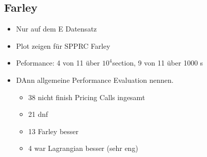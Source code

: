 \documentclass{article}
\begin{document}
\subsection*{Farley}
\begin{itemize}
    \item Nur auf dem E Datensatz
    \item Plot zeigen für SPPRC Farley
    \item Peformance: 4 von 11 über $10^4$section, 9 von 11 über 1000 s
    \item DAnn allgemeine Performance Evaluation nennen.
    \begin{itemize}
        \item 38 nicht finish Pricing Calls ingesamt
        \item 21 dnf
        \item 13 Farley besser
        \item 4 war Lagrangian besser (sehr eng)
    \end{itemize}
\end{itemize}
\end{document}
